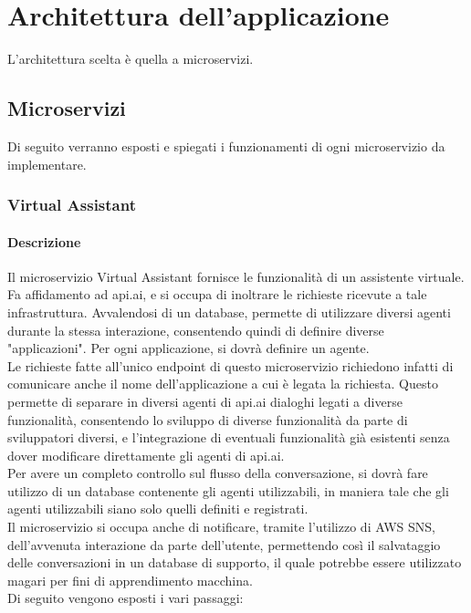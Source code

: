 
\section{Architettura dell'applicazione}
L'architettura scelta è quella a microservizi.\\
\subsection{Microservizi}
Di seguito verranno esposti e spiegati i funzionamenti di ogni microservizio da implementare.
\subsubsection{Virtual Assistant}
\paragraph{Descrizione}
Il microservizio Virtual Assistant fornisce le funzionalità di un assistente virtuale. Fa affidamento ad api.ai, e si occupa di inoltrare le richieste ricevute a tale infrastruttura. Avvalendosi di un database, permette di utilizzare diversi agenti durante la stessa interazione, consentendo quindi di definire diverse "applicazioni". Per ogni applicazione, si dovrà definire un agente.\\ Le richieste fatte all'unico endpoint di questo microservizio richiedono infatti di comunicare anche il nome dell'applicazione a cui è legata la richiesta. Questo permette di separare in diversi agenti di api.ai dialoghi legati a diverse funzionalità, consentendo lo sviluppo di diverse funzionalità da parte di sviluppatori diversi, e l'integrazione di eventuali funzionalità già esistenti senza dover modificare direttamente gli agenti di api.ai. \\
Per avere un completo controllo sul flusso della conversazione, si dovrà fare utilizzo di un database contenente gli agenti utilizzabili, in maniera tale che gli agenti utilizzabili siano solo quelli definiti e registrati.\\
Il microservizio si occupa anche di notificare, tramite l'utilizzo di AWS SNS, dell'avvenuta interazione da parte dell'utente, permettendo così il salvataggio delle conversazioni in un database di supporto, il quale potrebbe essere utilizzato magari per fini di apprendimento macchina.\\
Di seguito vengono esposti i vari passaggi:
